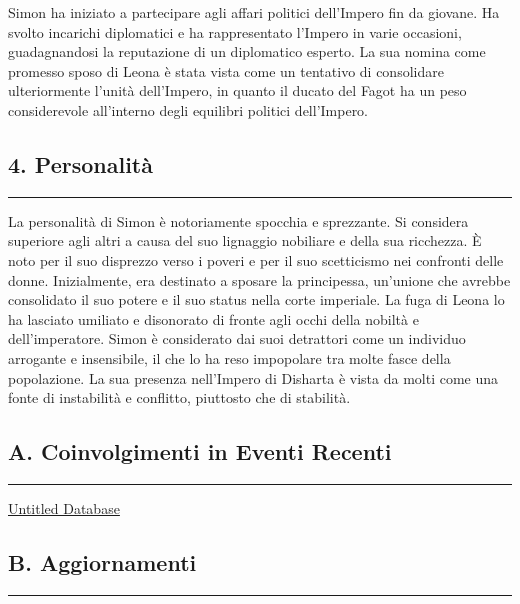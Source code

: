 Simon ha iniziato a partecipare agli affari politici dell'Impero fin da
giovane. Ha svolto incarichi diplomatici e ha rappresentato l'Impero in
varie occasioni, guadagnandosi la reputazione di un diplomatico esperto.
La sua nomina come promesso sposo di Leona è stata vista come un
tentativo di consolidare ulteriormente l'unità dell'Impero, in quanto il
ducato del Fagot ha un peso considerevole all'interno degli equilibri
politici dell'Impero.

\subsection{4. Personalità}\label{personalituxe0}

\begin{center}\rule{0.5\linewidth}{0.5pt}\end{center}

La personalità di Simon è notoriamente spocchia e sprezzante. Si
considera superiore agli altri a causa del suo lignaggio nobiliare e
della sua ricchezza. È noto per il suo disprezzo verso i poveri e per il
suo scetticismo nei confronti delle donne. Inizialmente, era destinato a
sposare la principessa, un'unione che avrebbe consolidato il suo potere
e il suo status nella corte imperiale. La fuga di Leona lo ha lasciato
umiliato e disonorato di fronte agli occhi della nobiltà e
dell'imperatore. Simon è considerato dai suoi detrattori come un
individuo arrogante e insensibile, il che lo ha reso impopolare tra
molte fasce della popolazione. La sua presenza nell'Impero di Disharta è
vista da molti come una fonte di instabilità e conflitto, piuttosto che
di stabilità.

\subsection{A. Coinvolgimenti in Eventi
Recenti}\label{a.-coinvolgimenti-in-eventi-recenti}

\begin{center}\rule{0.5\linewidth}{0.5pt}\end{center}

\href{Untitled\%20Database\%20fcbf6eebf0c34c96920278adf0753309.csv}{Untitled
Database}

\subsection{B. Aggiornamenti}\label{b.-aggiornamenti}

\begin{center}\rule{0.5\linewidth}{0.5pt}\end{center}

\href{Untitled\%2085f40f3d6ee74c04a22fd2d8e514fbd8.csv}{}
